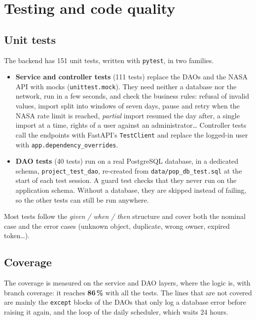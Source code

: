 \section{Testing and code quality}
\label{sec:testing}

\subsection{Unit tests}

The backend has 151 unit tests, written with \texttt{pytest}, in two families.

\begin{itemize}
  \item \textbf{Service and controller tests} (111 tests) replace the DAOs and the NASA API with
  mocks (\texttt{unittest.mock}). They need neither a database nor the network, run in a few
  seconds, and check the business rules: refusal of invalid values, import split into windows of
  seven days, pause and retry when the NASA rate limit is reached, \emph{partial} import resumed
  the day after, a single import at a time, rights of a user against an administrator\dots
  Controller tests call the endpoints with FastAPI's \texttt{TestClient} and replace the
  logged-in user with \texttt{app.dependency\_overrides}.
  \item \textbf{DAO tests} (40 tests) run on a real PostgreSQL database, in a dedicated schema,
  \texttt{project\_test\_dao}, re-created from \texttt{data/pop\_db\_test.sql} at the start of each
  test session. A guard test checks that they never run on the application schema. Without a
  database, they are skipped instead of failing, so the other tests can still be run anywhere.
\end{itemize}

Most tests follow the \emph{given / when / then} structure and cover both the nominal case and
the error cases (unknown object, duplicate, wrong owner, expired token\dots).

\subsection{Coverage}

The coverage is measured on the service and DAO layers, where the logic is, with branch coverage:
it reaches \textbf{86\,\%} with all the tests. The lines that are not covered are mainly the
\texttt{except} blocks of the DAOs that only log a database error before raising it again, and the
loop of the daily scheduler, which waits 24 hours.

